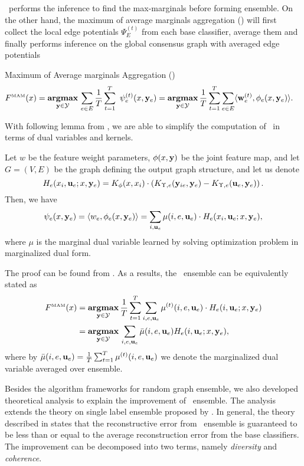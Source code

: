 {%
\amm\ performs the inference to find the max-marginals before forming ensemble. 
On the other hand, the maximum of average marginals aggregation (\mam) will first collect the local edge potentials $\Psi_E^{(t)}$ from each base classifier, average them and finally performs inference on the global consensus graph with averaged edge potentials
\begin{definition}{Maximum of Average marginals Aggregation (\mam)}
	\begin{align*}
		F^{\text{\tiny MAM}}(x) &= \underset{\vy \in \Ycal }{\argmax}\,\sum_{e\in E}\frac{1}{T}\sum_{t=1}^{T}\ \psi^{(t)}_e(x,\vy_e)
		= \underset{\vy \in \Ycal}{\argmax}\, \frac{1}{T} \sum_{t=1}^T \sum_{e\in E} \ip{\vw_e^{(t)}}{\phi_e(x,\vy_e)}. %
	\end{align*}
\end{definition}
With following lemma from , we are able to simplify the computation of \mam\ in terms of dual variables and kernels.
\begin{lemma}
	Let $w$ be the feature weight parameters, $\phi(x,\mathbf {y})$ be the joint feature map, and let $G=(V,E)$ be the graph defining the output graph structure, and let us denote
	$$H_e(x_i,\mathbf {u}_e;x,\mathbf {y}_e)  = K_\phi(x,x_i)\cdot\left(K_{\Upsilon,e}(\mathbf {y}_{ie},\mathbf {y}_e)-K_{\Upsilon,e}(\mathbf {u}_e,\mathbf {y}_e)\right).$$
	Then, we have
	\begin{align*}
	 \psi_e(x,\mathbf {y}_e) =  \langle w_e, \phi_e(x,\mathbf {y}_e) \rangle  =  \sum_{i,\mathbf {u}_e} \mu(i,e,\mathbf {u}_e) \cdot H_e(x_i,\mathbf {u}_e;x,\mathbf {y}_e),
	\end{align*}
	where $\mu$ is the marginal dual variable learned by solving optimization problem in marginalized dual form.
\end{lemma}
The proof can be found from . 
As a results, the \mam\ ensemble can be equivalently stated as
\begin{align*}
F^{\text{\tiny MAM}}(x) 
 & =\underset{\mathbf {y} \in \mathcal{Y}}{\textbf{argmax}}\, \frac{1}{T} \sum_{t=1}^T \sum_{i,e,\mathbf {u}_e} \mu^{(t)}(i,e,\mathbf {u}_e) \cdot H_e(i,\mathbf {u}_e;x,\mathbf {y}_e)\nonumber \\
 & =\underset{\mathbf {y} \in \mathcal{Y}}{\textbf{argmax}}\,   \sum_{i,e,\mathbf {u}_e}  \bar\mu(i,e,\mathbf {u}_e) H_e(i,\mathbf {u}_e;x,\mathbf {y}_e),
\end{align*}
where by $\bar\mu(i,e,\mathbf {u}_e)=\frac{1}{T}\sum_{t=1}^T\mu^{(t)}(i,e,\mathbf {u}_e)$ we denote the marginalized dual variable averaged over ensemble.

Besides the algorithm frameworks for random graph ensemble, we also developed theoretical analysis to explain the improvement of \mam\ ensemble.
The analysis extends the theory on single label ensemble proposed by \citet{Brown10good}.
In general, the theory described in  states that the reconstructive error from \mam\ ensemble is guaranteed to be less than or equal to the average reconstruction error from the base classifiers.
The improvement can be decomposed into two terms, namely \textit{diversity} and \textit{coherence}.

}
